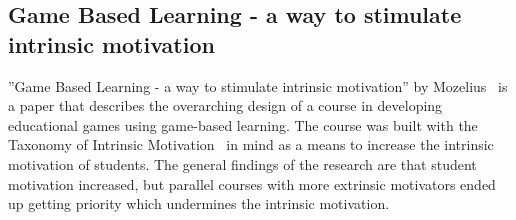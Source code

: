 \subsection{Game Based Learning - a way to stimulate intrinsic motivation} 
''Game Based Learning - a way to stimulate intrinsic motivation'' by Mozelius~\cite{mozelius2014game} is a paper that describes the overarching design of a course in developing educational games using game-based learning. The course was built with the Taxonomy of Intrinsic Motivation~\cite{maloneTax} in mind as a means to increase the intrinsic motivation of students. The general findings of the research are that student motivation increased, but parallel courses with more extrinsic motivators ended up getting priority which undermines the intrinsic motivation. 